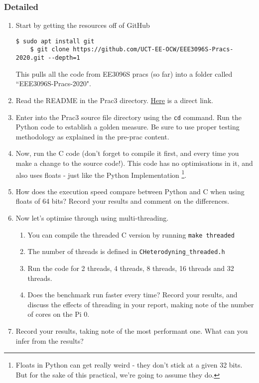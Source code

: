 \subsubsection{Detailed}
\begin{enumerate}
    \item Start by getting the resources off of GitHub
    \begin{lstlisting}[gobble=4]
    $ sudo apt install git
    $ git clone https://github.com/UCT-EE-OCW/EEE3096S-Pracs-2020.git --depth=1
    \end{lstlisting}
    This pulls all the code from EE3096S pracs (so far) into a folder called ``EEE3096S-Pracs-2020".
    \item Read the README in the Prac3 directory. \href{https://github.com/UCT-EE-OCW/EEE3096S-Pracs-2020/blob/master/Prac3/README.md}{Here} is a direct link.
    \item Enter into the Prac3 source file directory using the \verb|cd| command. Run the Python code to establish a golden measure. Be sure to use proper testing methodology as explained in the pre-prac content.
    \item Now, run the C code (don't forget to compile it first, and every time you make a change to the source code!). This code has no optimisations in it, and also uses floats - just like the Python Implementation \footnote{Floats in Python can get really weird - they don't stick at a given 32 bits. But for the sake of this practical, we're going to assume they do.}. 
    \item How does the execution speed compare between Python and C when using floats of 64 bits? Record your results and comment on the differences.
    \item Now let's optimise through using multi-threading.
    \begin{enumerate}
        \item You can compile the threaded C version by running \verb|make threaded|
        \item The number of threads is defined in \verb|CHeterodyning_threaded.h|
        \item Run the code for 2 threads, 4 threads, 8 threads, 16 threads and 32 threads.
        \item Does the benchmark run faster every time? Record your results, and discuss the effects of threading in your report, making note of the number of cores on the Pi 0.
    \end{enumerate}
    \item Record your results, taking note of the most performant one. What can you infer from the results?

\end{enumerate}
